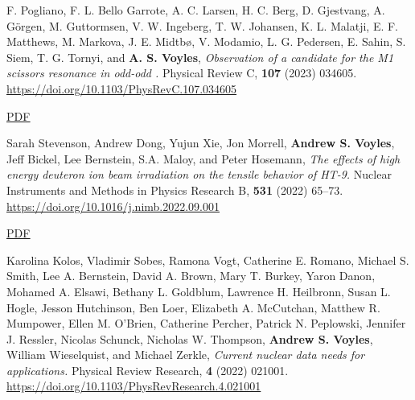\begin{bibsection}









\item F. Pogliano, F. L. Bello Garrote, A. C. Larsen, H. C. Berg, D. Gjestvang, A. Görgen, M. Guttormsen, V. W. Ingeberg, T. W. Johansen, K. L. Malatji, E. F. Matthews, M. Markova, J. E. Midtbø, V. Modamio, L. G. Pedersen, E. Sahin, S. Siem, T. G. Tornyi, and \textbf{A. S. Voyles}, \emph{Observation of a candidate for the M1 scissors resonance in odd-odd .} Physical Review C, \textbf{107} (2023) 034605. \\\url{https://doi.org/10.1103/PhysRevC.107.034605} 

\ifshort \vspace{0.1cm} \href{https://avoyles.github.io/papers/Pogliano2023_166Ho.pdf}{\underline{PDF}} \else  \fi 


\item Sarah Stevenson, Andrew Dong, Yujun Xie, Jon Morrell, \textbf{Andrew S. Voyles}, Jeff Bickel, Lee Bernstein, S.A. Maloy, and Peter Hosemann, \emph{The effects of high energy deuteron ion beam irradiation on the tensile behavior of HT-9.} Nuclear Instruments and Methods in Physics Research  B, \textbf{531} (2022) 65--73. \\\url{https://doi.org/10.1016/j.nimb.2022.09.001} 

\ifshort \vspace{0.1cm} \href{https://avoyles.github.io/papers/Stevenson2022_dogbones.pdf}{\underline{PDF}} \else  \fi 

\item Karolina Kolos,  Vladimir Sobes,  Ramona Vogt, Catherine E. Romano,  Michael S. Smith,  Lee A. Bernstein, David A. Brown,  Mary T. Burkey,  Yaron Danon,  Mohamed A. Elsawi,  Bethany L. Goldblum, Lawrence H. Heilbronn,  Susan L. Hogle,  Jesson Hutchinson,  Ben Loer,  Elizabeth A. McCutchan, Matthew R. Mumpower,  Ellen M. O’Brien,  Catherine Percher,  Patrick N. Peplowski,  Jennifer J. Ressler, Nicolas Schunck,  Nicholas W. Thompson,  \textbf{Andrew S. Voyles},  William Wieselquist,  and Michael Zerkle, \emph{Current nuclear data needs for applications.} Physical Review Research, \textbf{4} (2022) 021001. \\\url{https://doi.org/10.1103/PhysRevResearch.4.021001} 


\end{bibsection}
